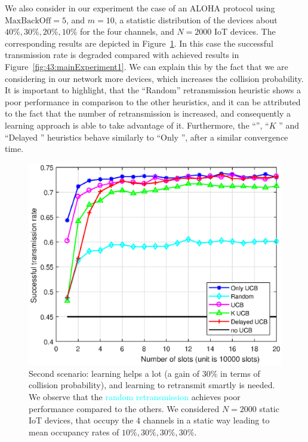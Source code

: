 We also consider in our experiment the case of an ALOHA protocol using $\mathrm{MaxBackOff}=5$, and $m=10$, a statistic distribution of the devices about $40\%, 30\%, 20\%, 10\%$ for the four channels, and $N=2000$ IoT devices.
The corresponding results are depicted in Figure~\ref{fig:43:mainExperiment2}.
In this case the successful transmission rate is degraded compared with achieved results in Figure~\ref{fig:43:mainExperiment1}.
We can explain this by the fact that we are considering in our network more devices, which increases the collision probability.
It is important to highlight, that the ``Random'' retransmission heuristic shows a poor performance in comparison to the other heuristics, and it can be attributed to the fact that the number of retransmission is increased, and consequently a
learning approach is able to take advantage of it.
Furthermore, the ``\UCB'', ``$K$ \UCB'' and ``Delayed \UCB'' heuristics behave similarly to ``Only \UCB'', after a similar convergence time.

\begin{figure}[h!]  %
	\centering
	\includegraphics[width=0.80\linewidth]{ResultsUCB2.eps}
	\caption[First comparison between the exposed heuristics for the retransmission: Only \UCB, Random, \UCB, $K$ \UCB, and Delayed \UCB]{
		Second scenario: learning helps a lot (a gain of $30\%$ in terms of collision probability), and learning to retransmit smartly is needed.
		We observe that the \textcolor{cyan}{random retransmission} achieves poor performance compared to the others.
		We considered $N=2000$ static IoT devices, that occupy the $4$ channels in a static way leading to mean occupancy rates of $10\%,30\%,30\%,30\%$.
	}
	\label{fig:43:mainExperiment2}
\end{figure}

